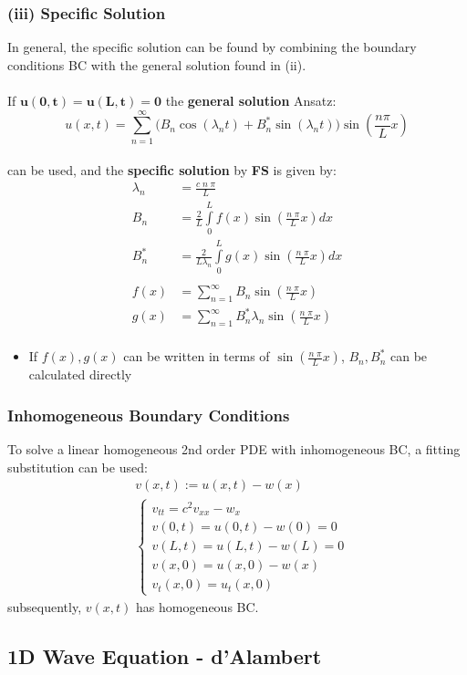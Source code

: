 \subsubsection{(iii) Specific Solution}
In general, the specific solution can be found by combining the boundary conditions BC 
with the general solution found in (ii).\\\\
If $\mathbf{u(0,t)=u(L,t)= 0}$ the \textbf{general solution} Ansatz:
\begin{equation*}
    u(x,t)=\sum\limits_{n=1}^{\infty}
    \Bigr( B_n \cos(\lambda _n t)+B_n^* \sin(\lambda_n t)\Bigr) \sin 
    \left(\frac{n \pi}{L}x \right)
\end{equation*}\\
can be used, and the \textbf{specific solution} by \textbf{FS} is given by:
\begin{align*}
    \lambda_n&=\frac{c\; n\; \pi}{L}\\
    B_n&=\frac{2}{L}\int\limits_0^L f(x)\sin(\frac{n\;\pi}{L}x)dx\\
    B_n^*&=\frac{2}{L\lambda_n} \int\limits_0^L g(x) \sin(\frac{n\;\pi}{L}x)dx\\\\
    f(x)&=\sum\limits_{n=1}^{\infty} B_n \sin(\frac{n\;\pi}{L}x)\\
    g(x)&=\sum\limits_{n=1}^{\infty} B_n^* \lambda_n \sin(\frac{n\;\pi}{L}x)\\
\end{align*}
\begin{itemize}
    \item If $f(x),g(x)$ can be written in terms of $\sin(\frac{n\;\pi}{L}x)$, $B_n, B_n^*$ 
    can be calculated directly
\end{itemize}
%
%
\subsubsection{Inhomogeneous Boundary Conditions}
To solve a linear homogeneous 2nd order PDE with inhomogeneous BC, a fitting substitution can be used:
\begin{align*}
    &v(x,t):= u(x,t) -w(x)\\
    &\begin{cases}
        v_{tt}=c^2v_{xx}-w_x\\
        v(0,t)=u(0,t)-w(0)=0\\
        v(L,t)=u(L,t)-w(L)=0\\
        v(x,0)=u(x,0)-w(x)\\
        v_t(x,0)=u_t(x,0)
    \end{cases}
\end{align*}
subsequently, $v(x,t)$ has homogeneous BC.
%
%
\subsection{1D Wave Equation - d'Alambert}